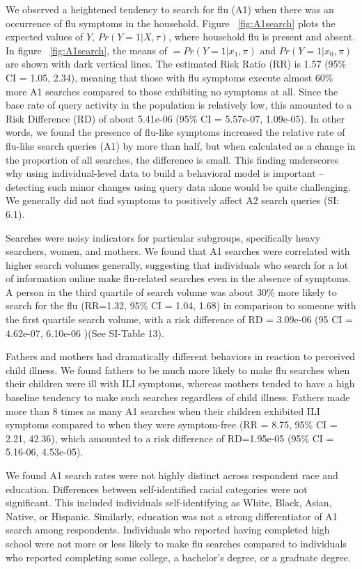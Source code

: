 \documentclass[fleqn,10pt]{wlscirep}
\begin{document}
We observed a heightened tendency to search for flu (A1) when there was an occurrence of flu symptoms in the household. Figure ~\ref{fig:A1search} plots the expected values of $Y$, $Pr(Y=1|X, \tau)$, where household flu is present and absent. In figure ~\ref{fig:A1search}, the means of $ = Pr(Y=1|x_1, \pi)$ and $ Pr(Y=1|x_0, \pi) $ are shown with dark vertical lines. The estimated Risk Ratio (RR) is 1.57 (95\% CI = 1.05, 2.34), meaning that those with flu symptoms execute almost 60\% more A1 searches compared to those exhibiting no symptoms at all. Since the base rate of query activity in the population is relatively low, this amounted to a Risk Difference (RD) of about 5.41e-06 (95\% CI = 5.57e-07, 1.09e-05). In other words, we found the presence of flu-like symptoms increased the relative rate of flu-like search queries (A1) by more than half, but when calculated as a change in the proportion of all searches, the difference is small. This finding underscores why using individual-level data to build a behavioral model is important -- detecting such minor changes using query data alone would be quite challenging. We generally did not find symptoms to positively affect A2 search queries (SI: 6.1).

Searches were noisy indicators for particular subgroups, specifically heavy searchers, women, and mothers. We found that A1 searches were correlated with higher search volumes generally, suggesting that individuals who search for a lot of information online make flu-related searches even in the absence of symptoms. A person in the third quartile of search volume was about 30\% more likely to search for the flu (RR=1.32, 95\% CI = 1.04, 1.68) in comparison to someone with the first quartile search volume, with a risk difference of RD = 3.09e-06 (95 CI = 4.62e-07, 6.10e-06 )(See SI-Table 13). 

Fathers and mothers had dramatically different behaviors in reaction to perceived child illness. We found fathers to be much more likely to make flu searches when their children were ill with ILI symptoms, whereas mothers tended to have a high baseline tendency to make such searches regardless of child illness. Fathers made more than 8 times as many A1 searches when their children exhibited ILI symptoms compared to when they were symptom-free (RR = 8.75, 95\% CI = 2.21, 42.36), which amounted to a risk difference of RD=1.95e-05 (95\% CI = 5.16-06, 4.53e-05).

We found A1 search rates were not highly distinct across respondent race and education. Differences between self-identified racial categories were not significant. This included individuals self-identifying as White, Black, Asian, Native, or Hispanic. Similarly, education was not a strong differentiator of A1 search among respondents. Individuals who reported having completed high school were not more or less likely to make flu searches compared to individuals who reported completing some college, a bachelor's degree, or a graduate degree. 
\end{document}
